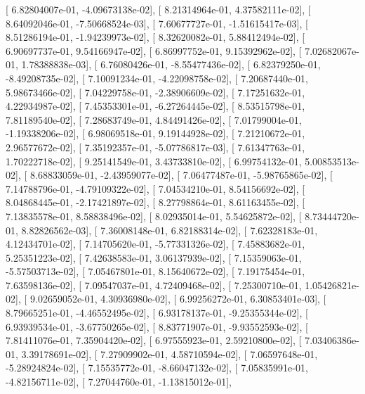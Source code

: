 \documentclass{article}
\begin{document}
       [  6.82804007e-01,  -4.09673138e-02],
       [  8.21314964e-01,   4.37582111e-02],
       [  8.64092046e-01,  -7.50668524e-03],
       [  7.60677727e-01,  -1.51615417e-03],
       [  8.51286194e-01,  -1.94239973e-02],
       [  8.32620082e-01,   5.88412494e-02],
       [  6.90697737e-01,   9.54166947e-02],
       [  6.86997752e-01,   9.15392962e-02],
       [  7.02682067e-01,   1.78388838e-03],
       [  6.76080426e-01,  -8.55477436e-02],
       [  6.82379250e-01,  -8.49208735e-02],
       [  7.10091234e-01,  -4.22098758e-02],
       [  7.20687440e-01,   5.98673466e-02],
       [  7.04229758e-01,  -2.38906609e-02],
       [  7.17251632e-01,   4.22934987e-02],
       [  7.45353301e-01,  -6.27264445e-02],
       [  8.53515798e-01,   7.81189540e-02],
       [  7.28683749e-01,   4.84491426e-02],
       [  7.01799004e-01,  -1.19338206e-02],
       [  6.98069518e-01,   9.19144928e-02],
       [  7.21210672e-01,   2.96577672e-02],
       [  7.35192357e-01,  -5.07786817e-03],
       [  7.61347763e-01,   1.70222718e-02],
       [  9.25141549e-01,   3.43733810e-02],
       [  6.99754132e-01,   5.00853513e-02],
       [  8.68833059e-01,  -2.43959077e-02],
       [  7.06477487e-01,  -5.98765865e-02],
       [  7.14788796e-01,  -4.79109322e-02],
       [  7.04534210e-01,   8.54156692e-02],
       [  8.04868445e-01,  -2.17421897e-02],
       [  8.27798864e-01,   8.61163455e-02],
       [  7.13835578e-01,   8.58838496e-02],
       [  8.02935014e-01,   5.54625872e-02],
       [  8.73444720e-01,   8.82826562e-03],
       [  7.36008148e-01,   6.82188314e-02],
       [  7.62328183e-01,   4.12434701e-02],
       [  7.14705620e-01,  -5.77331326e-02],
       [  7.45883682e-01,   5.25351223e-02],
       [  7.42638583e-01,   3.06137939e-02],
       [  7.15359063e-01,  -5.57503713e-02],
       [  7.05467801e-01,   8.15640672e-02],
       [  7.19175454e-01,   7.63598136e-02],
       [  7.09547037e-01,   4.72409468e-02],
       [  7.25300710e-01,   1.05426821e-02],
       [  9.02659052e-01,   4.30936980e-02],
       [  6.99256272e-01,   6.30853401e-03],
       [  8.79665251e-01,  -4.46552495e-02],
       [  6.93178137e-01,  -9.25355344e-02],
       [  6.93939534e-01,  -3.67750265e-02],
       [  8.83771907e-01,  -9.93552593e-02],
       [  7.81411076e-01,   7.35904420e-02],
       [  6.97555923e-01,   2.59210800e-02],
       [  7.03406386e-01,   3.39178691e-02],
       [  7.27909902e-01,   4.58710594e-02],
       [  7.06597648e-01,  -5.28924824e-02],
       [  7.15535772e-01,  -8.66047132e-02],
       [  7.05835991e-01,  -4.82156711e-02],
       [  7.27044760e-01,  -1.13815012e-01],
\end{document}
